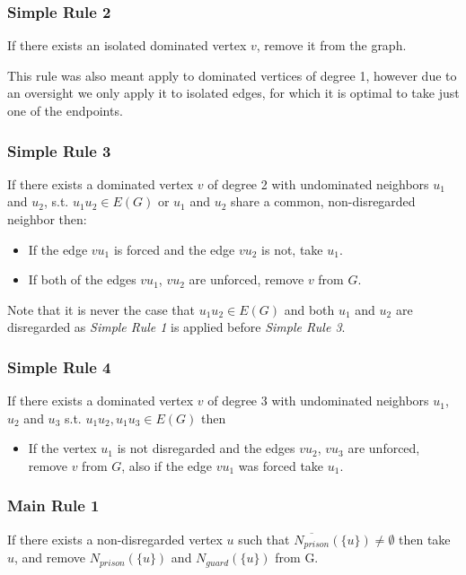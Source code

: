 \documentclass[a4paper,UKenglish,cleveref, autoref, thm-restate]{lipics-v2021}
\begin{document}
\subsubsection{Simple Rule 2}
If there exists an isolated dominated vertex $v$, remove it from the graph.

This rule was also meant apply to dominated vertices of degree 1, however due to an oversight we only apply it to isolated edges, for which it is optimal to take just one of the endpoints.

\subsubsection{Simple Rule 3}
If there exists a dominated vertex $v$ of degree 2 with undominated neighbors $u_1$ and $u_2$, s.t. $u_1 u_2 \in E(G)$ or $u_1$ and $u_2$ share a common, non-disregarded neighbor then:
\begin{itemize}
    \item If the edge $v u_1$ is forced and the edge $v u_2$ is not, take $u_1$.
    \item If both of the edges $v u_1$, $v u_2$ are unforced, remove $v$ from $G$.
\end{itemize}

Note that it is never the case that $u_1 u_2 \in E(G)$ and both $u_1$ and $u_2$ are disregarded as \emph{Simple Rule 1} is applied before \emph{Simple Rule 3}.

\subsubsection{Simple Rule 4}
If there exists a dominated vertex $v$ of degree 3 with undominated neighbors $u_1$, $u_2$ and $u_3$ s.t. $u_1 u_2, u_1 u_3 \in E(G)$ then
\begin{itemize}
    \item If the vertex $u_1$ is not disregarded and the edges $v u_2$, $v u_3$ are unforced, remove $v$ from $G$, also if the edge $v u_1$ was forced take $u_1$.
\end{itemize}


\subsubsection{Main Rule 1}
If there exists a non-disregarded vertex $u$ such that $\overline{N_{prison}}(\{u\}) \neq \emptyset$ then take $u$, and remove $N_{prison}(\{u\})$ and $N_{guard}{(\{u\})}$ from G.
\end{document}
